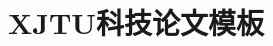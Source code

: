 \documentclass[UTF8,AutoFakeBold,twoside]{XJTUMCM}
\title{XJTU科技论文模板}
\begin{document}

\nocite{*}  %
\maketitle



\newpage

                                                              
\end{document}

